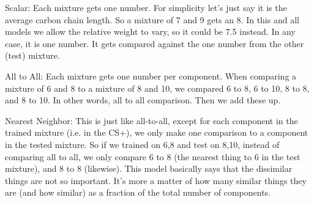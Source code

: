 \scriptsize Scalar: Each mixture gets one number.  For simplicity let's just say it is the average carbon chain length.  So a mixture of 7 and 9 gets an 8.  In this and all models we allow the relative weight to vary, so it could be 7.5 instead.  In any case, it is one number.  It gets compared against the one number from the other (test) mixture.  

All to All: Each mixture gets one number per component.  When comparing a mixture of 6 and 8 to a mixture of 8 and 10, we compared 6 to 8, 6 to 10, 8 to 8, and 8 to 10.  In other words, all to all comparison.  Then we add these up.  

Nearest Neighbor: This is just like all-to-all, except for each component in the trained mixture (i.e. in the CS+), we only make one comparison to a component in the tested mixture.  So if we trained on 6,8 and test on 8,10, instead of comparing all to all, we only compare 6 to 8 (the nearest thing to 6 in the test mixture), and 8 to 8 (likewise).  This model basically says that the dissimilar things are not so important.  It's more a matter of how many similar things they are (and how similar) as a fraction of the total number of components.  
